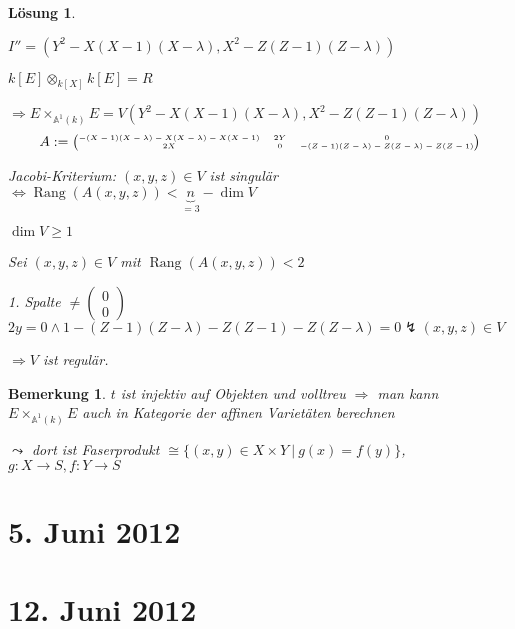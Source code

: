 \documentclass[paper = A4, fontsize=12pt, numbers=noendperiod, chapterprefix=true]{scrbook}
\theoremstyle{break}
\newtheorem{Loes}{L\"osung}
\theoremstyle{nonumberbreak}
\newtheorem{bem}{Bemerkung}
\theoremstyle{nonumberplain}
\DeclareMathOperator{\Rang}{Rang}
\newcommand{\A}{\mathbb{A}}
\newcommand{\X}{\times}
\begin{document}
\begin{Loes}
\begin{enumerate}[a)]
\begin{center}
\end{center}
	$I'' = (Y^2 - X(X-1)(X-\lambda), X^2 - Z(Z-1)(Z-\lambda))$
	
	$k[E] \otimes_{k[X]} k[E] = R$
	
	$\Rightarrow E \X_{\A^1(k)} E = V(Y^2 - X(X-1)(X-\lambda), X^2 - Z(Z-1)(Z-\lambda))$
		\[ A := \tiny\begin{pmatrix} -(X-1)(X-\lambda) - X(X-\lambda) - X(X-1) & 2Y & 0\\
		2X & 0 & -(Z-1)(Z-\lambda) - Z(Z-\lambda) - Z(Z-1)\normalsize\end{pmatrix} \]
		
	\emph{Jacobi-Kriterium:} $(x,y,z) \in V$ ist singul\"ar $\Leftrightarrow \Rang(A(x,y,z)) < \underbrace{n}_{=3} - \dim V$
	
	$\dim V \ge 1$
	
	Sei $(x,y,z) \in V$ mit $\Rang(A(x,y,z)) < 2$
	
	1. Spalte $\ne \begin{pmatrix}0\\0\end{pmatrix}$\\
	$2y = 0 \wedge 1 - (Z-1)(Z-\lambda) - Z(Z-1) - Z(Z-\lambda) = 0 \lightning (x,y,z) \in V$
	
	$\Rightarrow V$ ist regul\"ar.
\end{enumerate}\end{Loes}

\begin{bem}
$t$ ist injektiv auf Objekten und volltreu $\Rightarrow$ man kann $E \X_{\A^1(k)} E$ auch in Kategorie der affinen Variet\"aten berechnen

$\leadsto$ dort ist Faserprodukt $\cong \{ (x,y) \in X \X Y \ |\ g(x) = f(y)\}$, $g: X \to S, f: Y \to S$
\end{bem}


\newpage
\section{5. Juni 2012}
\setcounter{Aufg}{0}
\setcounter{Loes}{0}

\newpage
\section{12. Juni 2012}
\setcounter{Aufg}{0}
\setcounter{Loes}{0}
\end{document}
